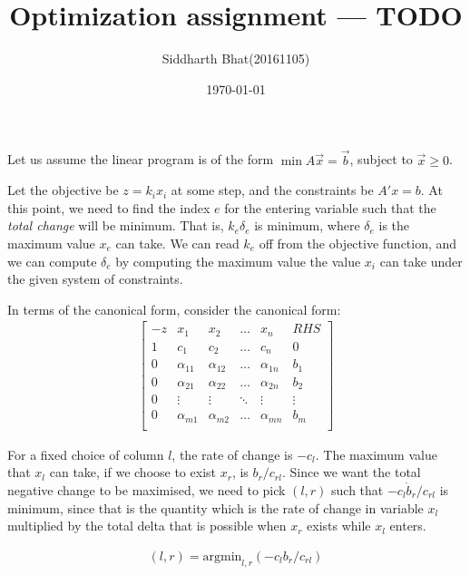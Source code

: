 \documentclass[11pt]{article}
\author{Siddharth Bhat(20161105)}
\title{Optimization assignment --- TODO}
\date{\today}
\renewcommand{\l}{\left}
\renewcommand{\r}{\right}
\begin{document}
\maketitle
\thispagestyle{fancy}
Let us assume the linear program is of the form $\min A\vec{x} = \vec{b}$, 
subject to $\vec x \geq 0$.

Let the objective be $z = k_i x_i$ at some step, and the constraints be
$A'x = b$. At this point, we need to find the index $e$ for the entering
variable such that the \textit{total change} will be minimum. That is,
$k_e \delta_e$ is minimum, where $\delta_e$ is the maximum value $x_e$ can take.
We can read $k_e$ off from the objective function, and we can compute $\delta_e$
by computing the maximum value the value $x_i$ can take under the given system
of constraints.


In terms of the canonical form, consider the canonical form:
\begin{align*}
    \begin{bmatrix}
        -z & x_1 & x_2 & \dots & x_n & RHS \\
        1 & c_1 & c_2 & \dots & c_n & 0 \\
        0 & \alpha_{11} & \alpha_{12} & \dots & \alpha_{1n} & b_1 \\
        0 & \alpha_{21} & \alpha_{22} & \dots & \alpha_{2n} & b_2 \\
        0 & \vdots & \vdots & \ddots & \vdots & \vdots \\
        0 & \alpha_{m1} & \alpha_{m2} & \dots & \alpha_{mn} & b_m \\
    \end{bmatrix}
\end{align*}


For a fixed choice of column $l$, the rate of change is $-c_l$. The maximum
value that $x_l$ can take, if we choose to exist $x_r$,
is $b_r / c_{rl}$. Since we want the total negative change to be maximised, we need to
pick $(l, r)$ such that $-c_l \dot b_r / c_{rl}$ is minimum, since that is 
the quantity which is the rate of change in variable $x_l$ multiplied by the 
total delta that is possible when $x_r$ exists while $x_l$ enters.

\begin{align*}
    (l, r) = \text{argmin}_{l, r} \l( -c_l b_r / c_{rl} \r)
\end{align*}
\end{document}
